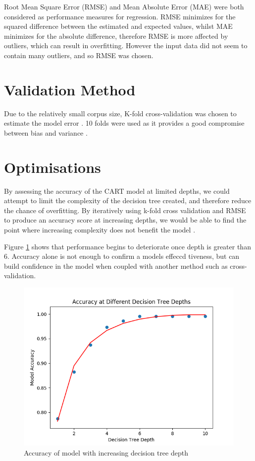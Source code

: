 \documentclass[12pt]{article}
\begin{document}
Root Mean Square Error (RMSE) and Mean Absolute Error (MAE) were both considered as performance measures for regression. RMSE minimizes for the squared difference between the estimated and expected values, whilst MAE minimizes for the absolute difference, therefore RMSE is more affected by outliers, which can result in overfitting. However the input data did not seem to contain many outliers, and so RMSE was chosen.

\section{Validation Method}

Due to the relatively small corpus size, K-fold cross-validation was chosen to estimate the model error \cite{gron_2018}. 10 folds were used as it provides a good compromise between bias and variance \cite{hastie01statisticallearning}.

\section{Optimisations}

By assessing the accuracy of the CART model at limited depths, we could attempt to limit the complexity of the decision tree created, and therefore reduce the chance of overfitting. By iteratively using k-fold cross validation and RMSE to produce an accuracy score at increasing depths, we would be able to find the point where increasing complexity does not benefit the model \cite{massaron_mueller_2015}. 

Figure \ref{fig:depth} shows that performance begins to deteriorate once depth is greater than 6. Accuracy alone is not enough to confirm a models effeccd tiveness, but can build confidence in the model when coupled with another method such as cross-validation.

\begin{figure}[!ht]
\centering
\includegraphics[width=0.8 \linewidth]{images/depth}
\caption{Accuracy of model with increasing decision tree depth}
\label{fig:depth}
\end{figure}
\end{document}
